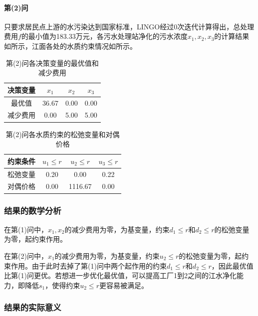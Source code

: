 \documentclass[12pt,a4paper]{article}
\begin{document}
\paragraph{第(2)问} 只要求居民点上游的水污染达到国家标准，LINGO经过0次迭代计算得出，总处理费用$f$的最小值为183.33万元，各污水处理站净化的污水浓度$x_1,x_2,x_3$的计算结果如所示，江面各处的水质约束情况如所示。

\begin{table}[H]
    \centering
    \caption{第(2)问各决策变量的最优值和减少费用}
    \label{tab:ex10_result_up}
    \begin{tabular}{c|ccc}
        \toprule
        决策变量 & \(x_1\) & \(x_2\) & \(x_3\)\tabularnewline
        \midrule
        最优值 & 36.67 & 0.00 & 0.00\tabularnewline
        减少费用 & 0.00 & 5.00 & 5.00\tabularnewline
        \bottomrule
    \end{tabular}
\end{table}

\begin{table}[H]
    \centering
    \caption{第(2)问各水质约束的松弛变量和对偶价格}
    \label{tab:ex10_result_cons_up}
    \begin{tabular}{c|ccc}
        \toprule
        约束条件 & \(u_1\le r\) & \(u_2\le r\) & \(u_3 \le r\)\tabularnewline
        \midrule
        松弛变量 & 0.20 & 0.00 & 0.22\tabularnewline
        对偶价格 & 0.00 & 1116.67 & 0.00\tabularnewline
        \bottomrule
    \end{tabular}
\end{table}

\subsubsection{结果的数学分析}

在第(1)问中，$x_1,x_2$的减少费用为零，为基变量，约束\(d_1 \le r\)和\(d_2 \le r\)的松弛变量为零，起约束作用。

在第(2)问中，$x_1$的减少费用为零，为基变量，约束\(u_2\le r\)的松弛变量为零，起约束作用。由于此时去掉了第(1)问中两个起作用的约束\(d_1 \le r\)和\(d_2 \le r\)，因此最优值比第(1)问更优。若想进一步优化最优值，可以提高工厂1到2之间的江水净化能力，即降低$s_1$，使得约束\(u_2\le r\)更容易被满足。

\subsubsection{结果的实际意义}
\end{document}
